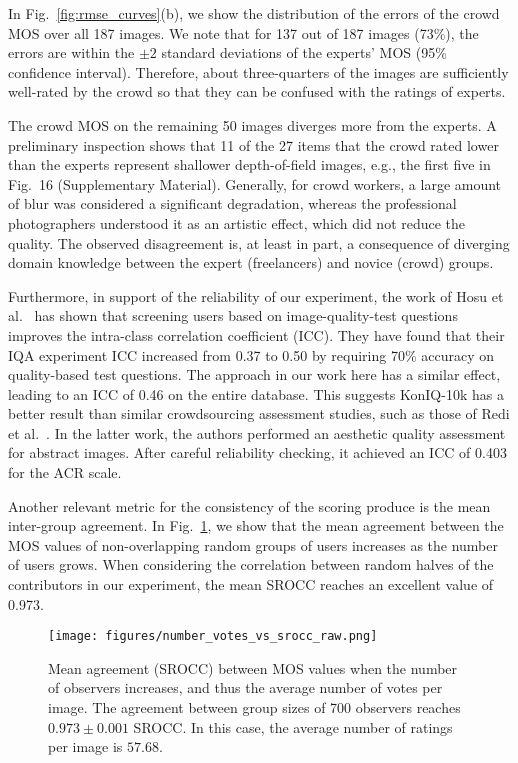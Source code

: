 \documentclass[10pt,journal,compsoc]{IEEEtran}
\begin{document}
In Fig.~\ref{fig:rmse_curves}(b), we show the distribution of the errors of the crowd MOS over all 187 images. We note that for 137 out of 187 images (73\%), the errors are within the $\pm 2$ standard deviations of the experts' MOS (95\% confidence interval). Therefore, about three-quarters of the images are sufficiently well-rated by the crowd so that they can be confused with the ratings of experts.

The crowd MOS on the remaining 50 images diverges more from the experts. A preliminary inspection shows that 11 of the 27 items that the crowd rated lower than the experts represent shallower depth-of-field images, e.g., the first five in Fig.~16 (Supplementary Material). 
Generally, for crowd workers, a large amount of blur was considered a significant degradation, whereas the professional photographers understood it as an artistic effect, which did not reduce the quality. The observed disagreement is, at least in part, a consequence of diverging domain knowledge between the expert (freelancers) and novice (crowd) groups.



Furthermore, in support of the reliability of our experiment, the work of Hosu et al.\ \cite{QoMEXReliability} has shown that screening users based on image-quality-test questions improves the intra-class correlation coefficient (ICC). They have found that their IQA experiment ICC increased from 0.37 to 0.50 by requiring 70\% accuracy on quality-based test questions. The approach in our work here has a similar effect, leading to an ICC of 0.46 on the entire database. This suggests KonIQ-10k has a better result than similar crowdsourcing assessment studies, such as those of Redi et al.~\cite{siahaan_reliable_2016}. In the latter work, the authors performed an aesthetic quality assessment for abstract images. After careful reliability checking, it achieved an ICC of 0.403 for the ACR scale.


Another relevant metric for the consistency of the scoring produce is the mean inter-group agreement. In Fig.\ \ref{fig:group-agreement}, we show that the mean agreement between the MOS values of non-overlapping random groups of users increases as the number of users grows. When considering the correlation between random halves of the contributors in our experiment, the mean SROCC reaches an excellent value of 0.973.

\begin{figure}[!t]
\centering
\texttt{[image: figures/number\_votes\_vs\_srocc\_raw.png]}
\caption{Mean agreement (SROCC) between MOS values when the number of observers increases, and thus the average number of votes per image. The agreement between group sizes of 700 observers reaches $0.973 \pm 0.001$ SROCC. In this case, the average number of ratings per image is $57.68$.}
\label{fig:group-agreement}
\end{figure}
\end{document}
